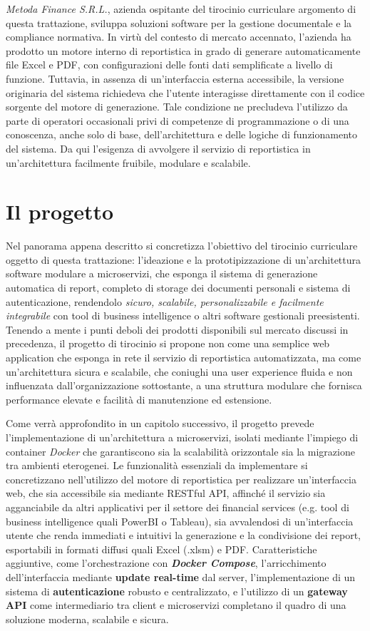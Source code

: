 \emph{Metoda Finance S.R.L.}, azienda ospitante del tirocinio curriculare argomento di questa trattazione, sviluppa soluzioni software per la gestione documentale e la compliance normativa. In virtù del contesto di mercato accennato, l'azienda ha prodotto un motore interno di reportistica in grado di generare automaticamente file Excel e PDF, con configurazioni delle fonti dati semplificate a livello di funzione. Tuttavia, in assenza di un’interfaccia esterna accessibile, la versione originaria del sistema richiedeva che l’utente interagisse direttamente con il codice sorgente del motore di generazione. Tale condizione ne precludeva l’utilizzo da parte di operatori occasionali privi di competenze di programmazione o di una conoscenza, anche solo di base, dell’architettura e delle logiche di funzionamento del sistema. Da qui l’esigenza di avvolgere il servizio di reportistica in un'architettura facilmente fruibile, modulare e scalabile.

\section{Il progetto}
Nel panorama appena descritto si concretizza l'obiettivo del tirocinio curriculare oggetto di questa trattazione: l’ideazione e la prototipizzazione di un'architettura software modulare a microservizi, che esponga il sistema di generazione automatica di report, completo di storage dei documenti personali e sistema di autenticazione, rendendolo \emph{sicuro, scalabile, personalizzabile e facilmente integrabile} con tool di business intelligence o altri software gestionali preesistenti. Tenendo a mente i punti deboli dei prodotti disponibili sul mercato discussi in precedenza, il progetto di tirocinio si propone non come una semplice web application che esponga in rete il servizio di reportistica automatizzata, ma come un'architettura sicura e scalabile, che coniughi una user experience fluida e non influenzata dall'organizzazione sottostante, a una struttura modulare che fornisca performance elevate e facilità di manutenzione ed estensione.

Come verrà approfondito in un capitolo successivo, il progetto prevede l'implementazione di un'architettura a microservizi, isolati mediante l'impiego di container \emph{Docker} che garantiscono sia la scalabilità orizzontale sia la migrazione tra ambienti eterogenei.
Le funzionalità essenziali da implementare si concretizzano nell'utilizzo del motore di reportistica per realizzare un'interfaccia web, che sia accessibile sia mediante RESTful API, affinché il servizio sia agganciabile da altri applicativi per il settore dei financial services (e.g. tool di business intelligence quali PowerBI o Tableau), sia avvalendosi di un'interfaccia utente che renda immediati e intuitivi la generazione e la condivisione dei report, esportabili in formati diffusi quali Excel (.xlsm) e PDF.
Caratteristiche aggiuntive, come l'orchestrazione con \emph{\textbf{Docker Compose}}, l'arricchimento dell'interfaccia mediante \textbf{update real-time} dal server, l'implementazione di un sistema di \textbf{autenticazione} robusto e centralizzato, e l'utilizzo di un \textbf{gateway API} come intermediario tra client e microservizi completano il quadro di una soluzione moderna, scalabile e sicura.

